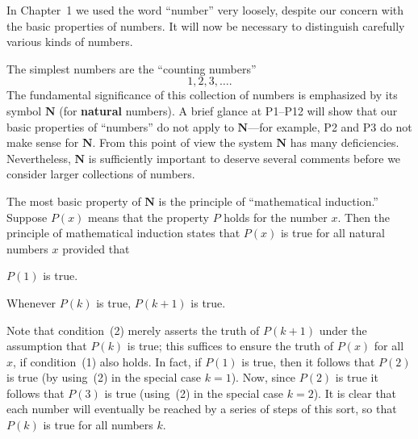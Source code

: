 

In Chapter~1 we used the word ``number'' very loosely, despite our concern
with the basic properties of numbers. It will now be necessary to distinguish
carefully various kinds of numbers.

The simplest numbers are the ``counting numbers''
\[ 1, 2, 3, \dots. \]
The fundamental significance of this collection of numbers is emphasized by
its symbol $\mathbf{N}$ (for \textbf{natural} numbers). A brief glance at
P1--P12 will show that our basic properties of ``numbers'' do not apply to
$\mathbf{N}$---for example, P2 and P3 do not make sense for $\mathbf{N}$. From
this point of view the system $\mathbf{N}$ has many deficiencies.
Nevertheless, $\mathbf{N}$ is sufficiently important to deserve several
comments before we consider larger collections of numbers.

The most basic property of $\mathbf{N}$ is the principle of ``mathematical
induction.'' Suppose $P(x)$ means that the property $P$ holds for the number
$x$. Then the principle of mathematical induction states that $P(x)$ is true
for all natural numbers $x$ provided that

\begin{steps}
\item $P(1)$ is true.
\item Whenever $P(k)$ is true, $P(k+1)$ is true.
\end{steps}

Note that condition~(2) merely asserts the truth of $P(k+1)$ under the
assumption that $P(k)$ is true; this suffices to ensure the truth of $P(x)$
for all $x$, if condition~(1) also holds. In fact, if $P(1)$ is true, then it
follows that $P(2)$ is true (by using~(2) in the special case $k = 1$). Now,
since $P(2)$ is true it follows that $P(3)$ is true (using~(2) in the special
case $k = 2$). It is clear that each number will eventually be reached by a
series of steps of this sort, so that $P(k)$ is true for all numbers $k$.

